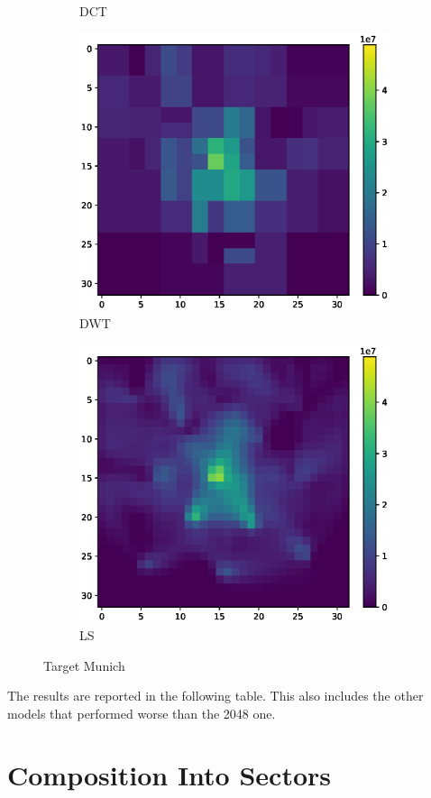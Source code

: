 \begin{figure}
\begin{subfigure}[b]{0.32\textwidth}
        \caption{DCT}
    \end{subfigure}    
    \begin{subfigure}[b]{0.32\textwidth}
        \includegraphics[width=\textwidth]{figures/06_results/gaussian_plume_example/munich/bp_dwt_snr_20_db.eps}
        \caption{DWT}
    \end{subfigure}
    \begin{subfigure}[b]{0.32\textwidth}
        \includegraphics[width=\textwidth]{figures/06_results/gaussian_plume_example/munich/least_squares_snr_20_db.eps}
        \caption{LS}
    \end{subfigure}
    \caption{Target Munich}
\end{figure}
The results are reported in the following table.
This also includes the other models that performed worse than the 2048 one.

\section{Composition Into Sectors}

